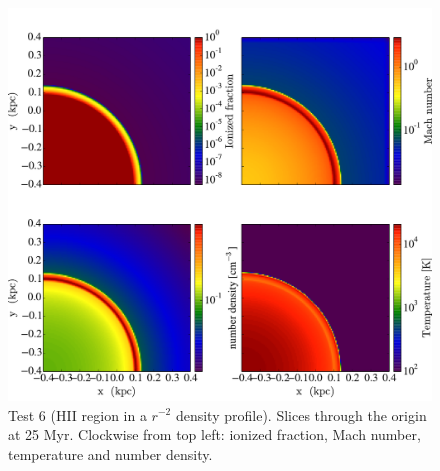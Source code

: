 \begin{figure}[t]
\centerline{\hfill
  \includegraphics[scale=0.42, trim=0.0cm 0.0cm 0.0cm 0.0cm]{test6_slices.pdf}
  \hfill}
  \caption{Test 6 (HII region in a $r^{-2}$ density profile). Slices
    through the origin at 25 Myr.  Clockwise from top left: ionized
    fraction, Mach number, temperature and number density.}
  \label{fig:test6_slices}
\end{figure}






